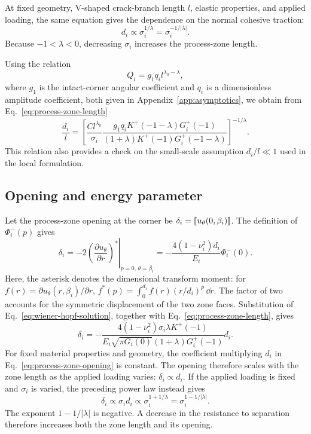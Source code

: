 At fixed geometry, V-shaped crack-branch length $l$, elastic properties,
and applied loading, the same equation gives the dependence on the normal cohesive
traction:
\begin{equation*}
  d_i\propto \sigma_i^{1/\lambda}
  =\sigma_i^{-1/|\lambda|}.
\end{equation*}
Because $-1<\lambda<0$, decreasing $\sigma_i$ increases the
process-zone length.

Using the relation
\begin{equation*}
  Q_i=g_1q_i l^{\lambda_0-\lambda},
\end{equation*}
where $g_1$ is the intact-corner angular coefficient and $q_i$ is a
dimensionless amplitude coefficient, both given in
Appendix~\ref{app:asymptotics}, we obtain from
Eq.~\eqref{eq:process-zone-length}
\begin{equation}
\label{eq:normalized-process-zone-length}
  \frac{d_i}{l}=
  \left[
    \frac{Cl^{\lambda_0}}{\sigma_i}
    \frac{g_1q_iK^+(-1-\lambda)G_i^+(-1)}
    {(1+\lambda)K^+(-1)G_i^+(-1-\lambda)}
  \right]^{-1/\lambda}.
\end{equation}
This relation also provides a check on the small-scale assumption
$d_i/l\ll1$ used in the local formulation.

\subsection{Opening and energy parameter}
\label{subsec:zone-parameters}

Let the process-zone opening at the corner be
$\delta_i=\left[\!\left[u_\theta(0,\beta_i)\right]\!\right]$.
The definition of $\Phi_i^-(p)$ gives
\begin{equation*}
  \delta_i
  =-2
    \left.
      \left(\frac{\partial u_\theta}{\partial r}\right)^*
    \right|_{p=0,\,\theta=\beta_i}
  =-\frac{4(1-\nu_i^2)d_i}{E_i}\Phi_i^-(0).
\end{equation*}
Here, the asterisk denotes the dimensional transform moment:
for $f(r)=\partial u_\theta(r,\beta_i)/\partial r$,
$f^*(p)=\int_0^{d_i}f(r)(r/d_i)^p\,\dd r$.
The factor of two accounts for the symmetric displacement of the two
zone faces. Substitution of Eq.~\eqref{eq:wiener-hopf-solution},
together with Eq.~\eqref{eq:process-zone-length}, gives
\begin{equation}
\label{eq:process-zone-opening}
  \delta_i=
  -\frac{4(1-\nu_i^2)\sigma_i\lambda K^+(-1)}
  {E_i\sqrt{\pi G_i(0)}(1+\lambda)G_i^+(-1)}d_i.
\end{equation}
For fixed material properties and geometry, the coefficient multiplying
$d_i$ in Eq.~\eqref{eq:process-zone-opening} is constant. The opening
therefore scales with the zone length as the applied loading varies:
$\delta_i\propto d_i$. If the applied loading is fixed and $\sigma_i$
is varied, the preceding power law instead gives
\begin{equation*}
  \delta_i\propto \sigma_i d_i
  \propto \sigma_i^{1+1/\lambda}
  =\sigma_i^{1-1/|\lambda|}.
\end{equation*}
The exponent $1-1/|\lambda|$ is negative. A decrease in the resistance
to separation therefore increases both the zone length and its opening.

